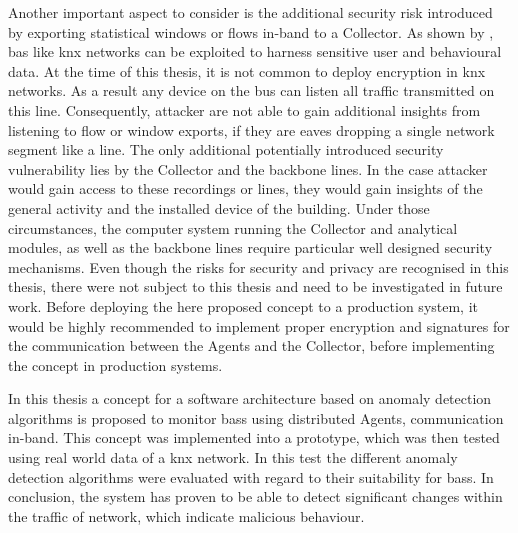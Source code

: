 Another important aspect to consider is the additional security risk introduced by exporting statistical windows or flows in-band to a Collector.
As shown by \textcite{Mundt2012}, \gls{bas} like \gls{knx} networks can be exploited to harness sensitive user and behavioural data.
At the time of this thesis, it is not common to deploy encryption in \gls{knx} networks.
As a result any device on the bus can listen all traffic transmitted on this line.
Consequently, attacker are not able to gain additional insights from listening to flow or window exports, if they are eaves dropping a single network segment like a line.
The only additional potentially introduced security vulnerability lies by the Collector and the backbone lines. In the case attacker would gain access to these recordings or lines, they would gain insights of the general activity and the installed device of the building.
Under those circumstances, the computer system running the Collector and analytical modules, as well as the backbone lines require particular well designed security mechanisms.
Even though the risks for security and privacy are recognised in this thesis, there were not subject to this thesis and need to be investigated in future work.
Before deploying the here proposed concept to a production system, it would be highly recommended to implement proper encryption and signatures for the communication between the Agents and the Collector, before implementing the concept in production systems.

In this thesis a concept for a software architecture based on anomaly detection algorithms is proposed to monitor \glspl{bas} using distributed Agents, communication in-band. This concept was implemented into a prototype, which was then tested using real world data of a \gls{knx} network.
In this test the different anomaly detection algorithms were evaluated with regard to their suitability for \glspl{bas}.
In conclusion, the system has proven to be able to detect significant changes within the traffic of network, which indicate malicious behaviour.